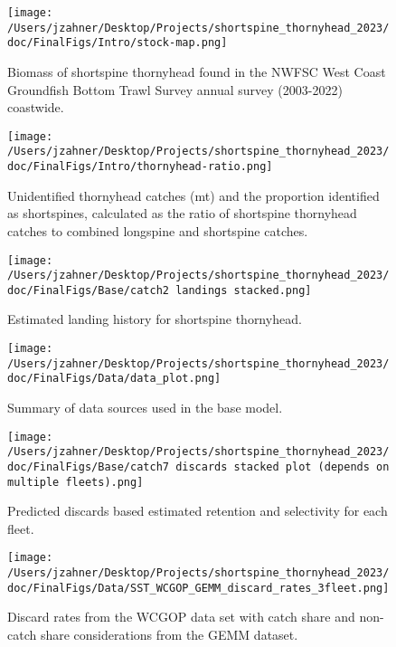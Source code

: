 \documentclass[11pt,
  english,
  letterpaper,
]{article}
\begin{document}
\begin{figure}
\centering
\texttt{[image: /Users/jzahner/Desktop/Projects/shortspine\_thornyhead\_2023/doc/FinalFigs/Intro/stock-map.png]}
\caption{Biomass of shortspine thornyhead found in the NWFSC West Coast Groundfish Bottom Trawl Survey annual survey (2003-2022) coastwide.\label{fig:stock-map}}
\end{figure}

\begin{figure}
\centering
\texttt{[image: /Users/jzahner/Desktop/Projects/shortspine\_thornyhead\_2023/doc/FinalFigs/Intro/thornyhead-ratio.png]}
\caption{Unidentified thornyhead catches (mt) and the proportion identified as shortspines, calculated as the ratio of shortspine thornyhead catches to combined longspine and shortspine catches.\label{fig:thornyhead-ratio}}
\end{figure}

\begin{figure}
\centering
\texttt{[image: /Users/jzahner/Desktop/Projects/shortspine\_thornyhead\_2023/doc/FinalFigs/Base/catch2 landings stacked.png]}
\caption{Estimated landing history for shortspine thornyhead.\label{fig:catch_hist}}
\end{figure}

\begin{figure}
\centering
\texttt{[image: /Users/jzahner/Desktop/Projects/shortspine\_thornyhead\_2023/doc/FinalFigs/Data/data\_plot.png]}
\caption{Summary of data sources used in the base model.\label{fig:assessment_data_timeseries}}
\end{figure}

\begin{figure}
\centering
\texttt{[image: /Users/jzahner/Desktop/Projects/shortspine\_thornyhead\_2023/doc/FinalFigs/Base/catch7 discards stacked plot (depends on multiple fleets).png]}
\caption{Predicted discards based estimated retention and selectivity for each fleet.\label{fig:disc_hist}}
\end{figure}

\begin{figure}
\centering
\texttt{[image: /Users/jzahner/Desktop/Projects/shortspine\_thornyhead\_2023/doc/FinalFigs/Data/SST\_WCGOP\_GEMM\_discard\_rates\_3fleet.png]}
\caption{Discard rates from the WCGOP data set with catch share and non-catch share considerations from the GEMM dataset.\label{fig:disc_rates_WCGOP}}
\end{figure}
\end{document}
